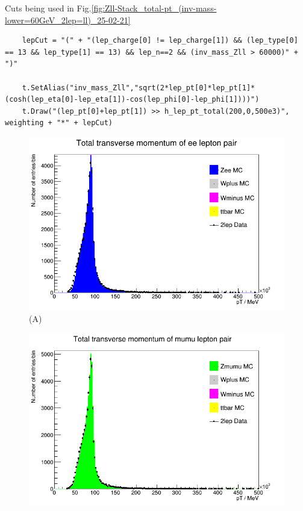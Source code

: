 Cuts being used in Fig.\ref{fig:Zll-Stack_total-pt_(inv-mass-lower=60GeV_2lep=ll)_25-02-21}
\begin{lstlisting}
    lepCut = "(" + "(lep_charge[0] != lep_charge[1]) && (lep_type[0] == 13 && lep_type[1] == 13) && lep_n==2 && (inv_mass_Zll > 60000)" + ")"

    t.SetAlias("inv_mass_Zll","sqrt(2*lep_pt[0]*lep_pt[1]*(cosh(lep_eta[0]-lep_eta[1])-cos(lep_phi[0]-lep_phi[1])))")
    t.Draw("(lep_pt[0]+lep_pt[1]) >> h_lep_pt_total(200,0,500e3)", weighting + "*" + lepCut)
\end{lstlisting}

\begin{figure}[h!]
    \centering
    \begin{minipage}{0.5\textwidth}
        \centering
        \includegraphics[width=\linewidth]{plots/25-02-2021/Zee-Stack_total-pt_(inv-mass-lower=60GeV_2lep=e+e-)_25-02-21_09-50.png}
        (A)
    \end{minipage}\hfill
    \begin{minipage}{0.5\textwidth}
        \centering
        \includegraphics[width=\linewidth]{plots/25-02-2021/Zmumu-Stack_total-pt_(inv-mass-lower=60GeV_2lep=mu+mu-)_25-02-21_09-50.png}

\end{minipage}
\end{figure}
